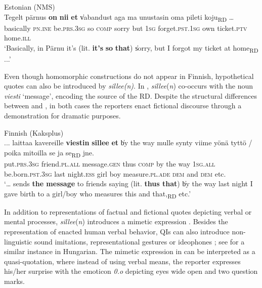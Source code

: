 \documentclass[output=paper,colorlinks,citecolor=brown]{langscibook}
\begin{document}
\ea\label{ex:teptiuk:8} {Estonian (NMS)}\\
\gll Tegelt pärnus \textbf{on} \textbf{nii} \textbf{et} \|vabandust aga ma unustasin oma pileti koju\|\textsubscript{RD} …\\
 basically \textsc{pn.ine} be.\textsc{prs}.3\textsc{sg} so \textsc{comp} {\db}sorry but 1\textsc{sg} forget.\textsc{pst.}1\textsc{sg} own ticket.\textsc{ptv} home.\textsc{ill}\\
\glt ‘Basically, in Pärnu it’s (lit. \textbf{it’s} \textbf{so} \textbf{that}) \|sorry, but I forgot my ticket at home\|\textsubscript{RD} ...’
\z

Even though homomorphic constructions do not appear in Finnish, hypothetical quotes can also be introduced by \textit{sillee(n)}. In , \textit{sillee}(\textit{n}) co-occurs with the noun \textit{viesti} ‘message’, encoding the source of the RD. Despite the structural differences between  and , in both cases the reporters enact fictional discourse through a demonstration for dramatic purposes.

\ea\label{ex:teptiuk:9} {Finnish (Kaksplus)}\\
\gll ... laittaa kavereille \textbf{viestin} \textbf{sillee} \textbf{et} \|by the way mulle synty viime yönä tyttö / poika mitoilla se ja se\|\textsubscript{RD} jne.\\
{} put.\textsc{prs}.3\textsc{sg} friend.\textsc{pl}.\textsc{all} message.\textsc{gen}  thus \textsc{comp} {\db}by the way  1\textsc{sg}.\textsc{all} be.born.\textsc{pst}.3\textsc{sg} last night.\textsc{ess} girl {} boy measure.\textsc{pl}.\textsc{ade} \textsc{dem} and \textsc{dem} etc.\\
\glt ‘… sends \textbf{the message} to friends saying (lit. \textbf{thus that}) \|by the way last night I gave birth to a girl/boy who measures this and that,\|\textsubscript{RD} etc.’
\z

In addition to representations of factual and fictional quotes depicting verbal or mental processes, \textit{sillee}(\textit{n}) introduces a mimetic expression . Besides the representation of enacted human verbal behavior, QIs can also introduce non-linguistic sound imitations, representational gestures or ideophones \citep[275-295]{Güldemann2008}; see  for a similar instance in Hungarian. The mimetic expression in  can be interpreted as a quasi-quotation, where instead of using verbal means, the reporter expresses his/her surprise with the emoticon {\textit{0.o}} depicting eyes wide open and two question marks.
\end{document}
